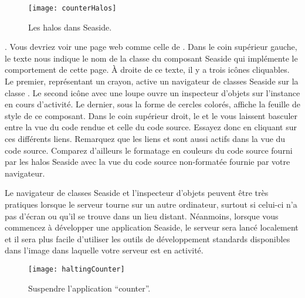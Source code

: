 \documentclass[a4paper,10pt,twoside]{book}
\begin{document}
\begin{figure}[ht]
\begin{center}
\texttt{[image: counterHalos]}
\caption{Les halos dans Seaside.}
\end{center}
\end{figure}

. Vous devriez voir une 
page web comme celle de .
Dans le coin supérieur gauche, le texte  nous indique le
nom de la classe du composant Seaside qui implémente le comportement
de cette page. À droite de ce texte, il y a trois icônes
cliquables.
Le premier, représentant un crayon, active un navigateur de classes
Seaside sur la classe . Le second icône avec une loupe
ouvre un inspecteur d'objets sur l'instance  en cours
d'activité.
Le dernier, sous la forme de cercles colorés, affiche la feuille de
style  de ce composant.
Dans le coin supérieur droit, le 
  et le   vous laissent basculer entre la vue du
 code rendue et celle du code source.
Essayez donc en cliquant sur ces différents liens.
Remarquez que les liens \link{++} et \link{{-}{-}} sont aussi actifs dans
la vue du code source.
Comparez d'ailleurs le formatage en couleurs du code source fourni
par les halos Seaside avec la vue du code source non-formatée fournie
par votre navigateur.

Le navigateur de classes Seaside et l'inspecteur d'objets peuvent être
très pratiques lorsque le serveur tourne sur un autre ordinateur,
surtout si celui-ci n'a pas d'écran ou qu'il se trouve dans un lieu
distant.
Néanmoins, lorsque vous commencez à développer une application
Seaside, le serveur sera lancé localement et il sera plus facile
d'utiliser les outils de développement standards disponibles dans
l'image \pharo dans laquelle votre serveur est en activité.
 
\begin{figure}[ht]
\begin{center}
\texttt{[image: haltingCounter]}
\caption{Suspendre l'application ``counter''.}
\end{center}
\end{figure}

\end{document}
